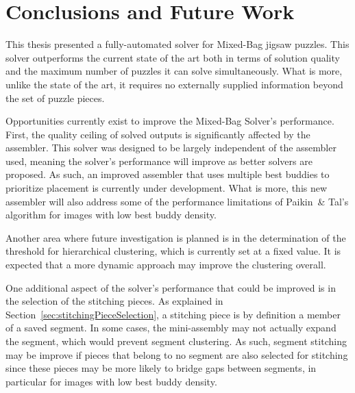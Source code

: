 \chapter{Conclusions and Future Work}

This thesis presented a fully-automated solver for Mixed-Bag jigsaw puzzles.  This solver outperforms the current state of the art both in terms of solution quality and the maximum number of puzzles it can solve simultaneously.  What is more, unlike the state of the art, it requires no externally supplied information beyond the set of puzzle pieces.

Opportunities currently exist to improve the Mixed-Bag Solver's performance.  First, the quality ceiling of solved outputs is significantly affected by the assembler.  This solver was designed to be largely independent of the assembler used, meaning the solver's performance will improve as better solvers are proposed. As such, an improved assembler that uses multiple best buddies to prioritize placement is currently under development.  What is more, this new assembler will also address some of the performance limitations of Paikin~\& Tal's algorithm for images with low best buddy density.

Another area where future investigation is planned is in the determination of the threshold for hierarchical clustering, which is currently set at a fixed value.  It is expected that a more dynamic approach may improve the clustering overall.

One additional aspect of the solver's performance that could be improved is in the selection of the stitching pieces.  As explained in Section~\ref{sec:stitchingPieceSelection}, a stitching piece is by definition a member of a saved segment.  In some cases, the mini-assembly may not actually expand the segment, which would prevent segment clustering.  As such, segment stitching may be improve if pieces that belong to no segment are also selected for stitching since these pieces may be more likely to bridge gaps between segments, in particular for images with low best buddy density.